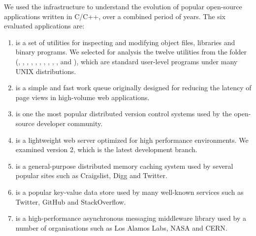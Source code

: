 We used the \covrig infrastructure to understand the evolution of
\numSystems popular open-source applications written in C/C++, over a
combined period of \numYears years. The six evaluated applications are:

\begin{enumerate}

\item[\gnu~\binutils\footnote{\url{http://www.gnu.org/software/binutils/}}]
is a set of utilities for inspecting and modifying object files,
libraries and binary programs.  We selected for analysis the twelve
utilities from the  folder (, ,
, , , , ,
, , ,  and ),
which are standard user-level programs under many UNIX distributions.

\item[\beanstalkd\footnote{\url{http://kr.github.io/beanstalkd/}}] is a
  simple and fast work queue originally designed for reducing the latency of
  page views in high-volume web applications.

\item[\git\footnote{\url{http://git-scm.com/}}] is one the
most popular distributed version control systems used by the open-source
developer community.

\item[\lighttpdtwo\footnote{\url{http://redmine.lighttpdtwo.net/projects/lighttpdtwo2/}}]
is a lightweight web server optimized for high performance environments.
We examined version 2, which is the latest development branch.

\item[\memcached\footnote{\url{http://memcached.org/}}]
is a general-purpose distributed memory caching system used by several
popular sites such as Craigslist, Digg and Twitter.

\item[\redis\footnote{\url{http://redis.io/}}]
is a popular key-value data store used by many well-known
services such as Twitter, GitHub and StackOverflow.

\item[\zeromq\footnote{\url{http://zeromq.org/}}]
is a high-performance asynchronous messaging middleware library used by
a number of organisations such as Los Alamos Labs, NASA and CERN.


\end{enumerate}

